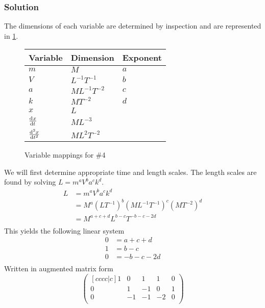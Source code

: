 \documentclass[12pt,twoside]{article}
\begin{document}
\subsubsection*{Solution}
The dimensions of each variable are determined by inspection and are represented
in \cref{fig:4-var-mappings}.
  \begin{figure}
    \centering
    \begin{tabularx}{0.5\textwidth}{XXX}
      Variable & Dimension & Exponent \\ \hline
      $m$ & $M$ & $a$ \\
      $V$ & $L^{-1}T^{-1}$ & $b$ \\
      $a$ & $ML^{-1}T^{-2}$ & $c$ \\
      $k$ & $MT^{-2}$ & $d$ \\
      $x$ & $L$ &  \\
      $\od{x}{t}$ & $ML^{-3}$ &  \\
      $\od[2]{x}{t}$ & $ML^{2}T^{-2}$ & \\
    \end{tabularx}
    \caption{Variable mappings for \#4}
    \label{fig:4-var-mappings}
  \end{figure}
We will first determine appropriate time and length scales. The length scales
are found by solving $L=m^aV^ba^ck^d$.
\begin{equation*}
  \begin{aligned}
    L &= m^aV^ba^ck^d \\
    &= M^{a}(LT^{-1})^b(ML^{-1}T^{-1})^c(MT^{-2})^d \\
    &= M^{a+c+d}L^{b-c}T^{-b-c-2d} \\
  \end{aligned}
\end{equation*}
This yields the following linear system
\begin{equation*}
  \begin{aligned}
    0 &= a + c + d \\
    1 &= b - c \\
    0 &= -b  - c - 2d \\
  \end{aligned}
\end{equation*}
Written in augmented matrix form
\begin{equation*}
  \begin{pmatrix}[cccc|c]
    1 & 0 & 1 & 1 & 0 \\
    0 & 1 & -1 & 0 & 1 \\
    0 & -1 & -1 & -2 & 0 \\
  \end{pmatrix}
\end{equation*}
\end{document}
